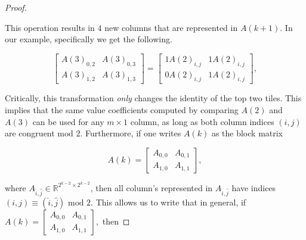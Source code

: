 \documentclass[12pt]{article}
\theoremstyle{plain}
\theoremstyle{definition}
\theoremstyle{remark}
\theoremstyle{definition}
\newcommand{\lablnode}[3]{\node[shape=circle,draw=none,fill=none, inner sep=0pt,minimum size=5pt] (A) at ( #1 , #2 ) {#3};}
\newcommand{\lablvertex}[3]{\node[shape=circle,draw=none,fill=white, inner sep=2pt,minimum size=5pt] (A) at ( #1 , #2 ) {#3};}
\begin{document}
\begin{proof}
\begin{center}
\end{center}

This operation results in $4$ new columns that are represented in $A(k+1)$. In our example, specifically we get the following. 

$$
\begin{bmatrix} 
    A(3)_{0,2} & A(3)_{0,3} \\ 
    A(3)_{1,2} & A(3)_{1,3} 
\end{bmatrix} = 
\begin{bmatrix} 
    1A(2)_{i,j} & 1A(2)_{i,j} \\ 
    0A(2)_{i,j} & 1A(2)_{i,j} 
\end{bmatrix},
$$

Critically, this transformation \textit{only} changes the identity of the top two tiles. This implies that the same value coefficients computed by comparing $A(2)$ and $A(3)$ can be used for any $m \times 1$ column, as long as both column indices $(i,j)$ are congruent $\text{mod } 2$. Furthermore, if one writes $A(k)$ as the block matrix

$$A(k) = \begin{bmatrix} A_{0,0} & A_{0,1} \\ A_{1,0} & A_{1,1} \end{bmatrix},$$

where $A_{\hat{i},\hat{j}} \in \mathbb{R}^{2^{k-2} \times 2^{k-2}}$, then all column's represented in $A_{\hat{i},\hat{j}}$ have indices $(i,j) \equiv (\hat{i},\hat{j}) \text{ mod } 2$. This allows us to write that in general, if $A(k) = \begin{bmatrix} A_{0,0} & A_{0,1} \\ A_{1,0} & A_{1,1} \end{bmatrix},$
then


\end{proof}
\end{document}
